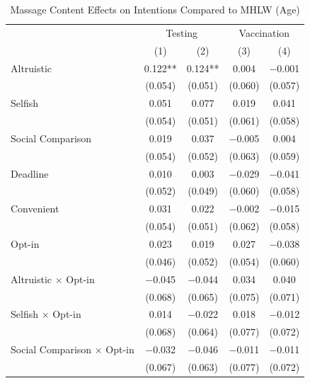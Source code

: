 \documentclass[
]{article}
\begin{document}
\begin{table}

\caption{\label{tab:reg-int-woA}Massage Content Effects on Intentions Compared to MHLW (Age)}
\centering
\fontsize{9}{11}\selectfont
\begin{threeparttable}
\begin{tabular}[t]{lcccc}
\toprule
\multicolumn{1}{c}{ } & \multicolumn{2}{c}{Testing} & \multicolumn{2}{c}{Vaccination} \\
\cmidrule(l{3pt}r{3pt}){2-3} \cmidrule(l{3pt}r{3pt}){4-5}
  & (1) & (2) & (3) & (4)\\
\midrule
Altruistic & \num{0.122}** & \num{0.124}** & \num{0.004} & \num{-0.001}\\
 & (\num{0.054}) & (\num{0.051}) & (\num{0.060}) & (\num{0.057})\\
Selfish & \num{0.051} & \num{0.077} & \num{0.019} & \num{0.041}\\
 & (\num{0.054}) & (\num{0.051}) & (\num{0.061}) & (\num{0.058})\\
Social Comparison & \num{0.019} & \num{0.037} & \num{-0.005} & \num{0.004}\\
 & (\num{0.054}) & (\num{0.052}) & (\num{0.063}) & (\num{0.059})\\
Deadline & \num{0.010} & \num{0.003} & \num{-0.029} & \num{-0.041}\\
 & (\num{0.052}) & (\num{0.049}) & (\num{0.060}) & (\num{0.058})\\
Convenient & \num{0.031} & \num{0.022} & \num{-0.002} & \num{-0.015}\\
 & (\num{0.054}) & (\num{0.051}) & (\num{0.062}) & (\num{0.058})\\
Opt-in & \num{0.023} & \num{0.019} & \num{0.027} & \num{-0.038}\\
 & (\num{0.046}) & (\num{0.052}) & (\num{0.054}) & (\num{0.060})\\
Altruistic $\times$ Opt-in & \num{-0.045} & \num{-0.044} & \num{0.034} & \num{0.040}\\
 & (\num{0.068}) & (\num{0.065}) & (\num{0.075}) & (\num{0.071})\\
Selfish $\times$ Opt-in & \num{0.014} & \num{-0.022} & \num{0.018} & \num{-0.012}\\
 & (\num{0.068}) & (\num{0.064}) & (\num{0.077}) & (\num{0.072})\\
Social Comparison $\times$ Opt-in & \num{-0.032} & \num{-0.046} & \num{-0.011} & \num{-0.011}\\
 & (\num{0.067}) & (\num{0.063}) & (\num{0.077}) & (\num{0.072})\\

\end{tabular}
\end{threeparttable}
\end{table}
\end{document}
